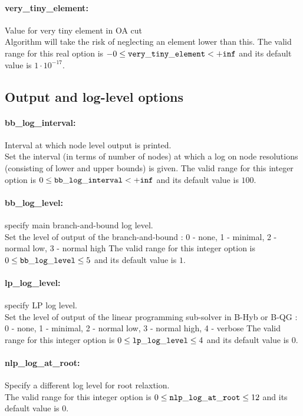 \paragraph{very\_tiny\_element:}\label{sec:very_tiny_element} Value for very tiny element in OA cut $\;$ \\
 Algorithm will take the risk of neglecting an
element lower than this. The valid range for this real option is 
$-0 \le {\tt very\_tiny\_element } <  {\tt +inf}$
and its default value is $1 \cdot 10^{-17}$.


\subsection{Output and log-level options}
\label{sec:Output_and_log-level_options}
\paragraph{bb\_log\_interval:}\label{sec:bb_log_interval} Interval at which node level output is printed. $\;$ \\
 Set the interval (in terms of number of nodes) at
which a log on node resolutions (consisting of
lower and upper bounds) is given. The valid range for this integer option is
$0 \le {\tt bb\_log\_interval } <  {\tt +inf}$
and its default value is $100$.


\paragraph{bb\_log\_level:}\label{sec:bb_log_level} specify main branch-and-bound log level. $\;$ \\
 Set the level of output of the branch-and-bound :
0 - none, 1 - minimal, 2 - normal low, 3 - normal
high The valid range for this integer option is
$0 \le {\tt bb\_log\_level } \le 5$
and its default value is $1$.


\paragraph{lp\_log\_level:}\label{sec:lp_log_level} specify LP log level. $\;$ \\
 Set the level of output of the linear programming
sub-solver in B-Hyb or B-QG : 0 - none, 1 -
minimal, 2 - normal low, 3 - normal high, 4 -
verbose The valid range for this integer option is
$0 \le {\tt lp\_log\_level } \le 4$
and its default value is $0$.


\paragraph{nlp\_log\_at\_root:}\label{sec:nlp_log_at_root}  Specify a different log level for root relaxtion. $\;$ \\
 The valid range for this integer option is
$0 \le {\tt nlp\_log\_at\_root } \le 12$
and its default value is $0$.


